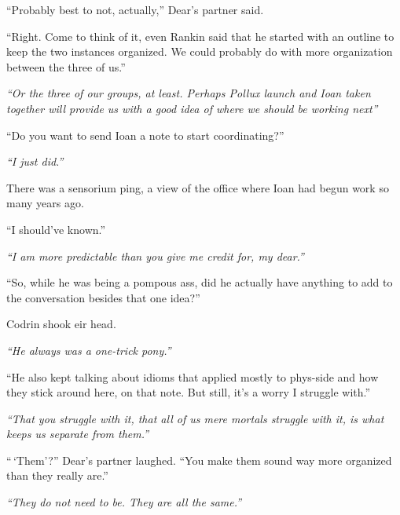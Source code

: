 ``Probably best to not, actually,'' Dear's partner said.

``Right. Come to think of it, even Rankin said that he started with an outline to keep the two instances organized. We could probably do with more organization between the three of us.''

\emph{``Or the three of our groups, at least. Perhaps Pollux launch and Ioan taken together will provide us with a good idea of where we should be working next''}

``Do you want to send Ioan a note to start coordinating?''

\emph{``I just did.''}

There was a sensorium ping, a view of the office where Ioan had begun work so many years ago.

``I should've known.''

\emph{``I am more predictable than you give me credit for, my dear.''}

``So, while he was being a pompous ass, did he actually have anything to add to the conversation besides that one idea?''

Codrin shook eir head.

\emph{``He always was a one-trick pony.''}

``He also kept talking about idioms that applied mostly to phys-side and how they stick around here, on that note. But still, it's a worry I struggle with.''

\emph{``That you struggle with it, that all of us mere mortals struggle with it, is what keeps us separate from them.''}

``\,`Them'?'' Dear's partner laughed. ``You make them sound way more organized than they really are.''

\emph{``They do not need to be. They are all the same.''}
